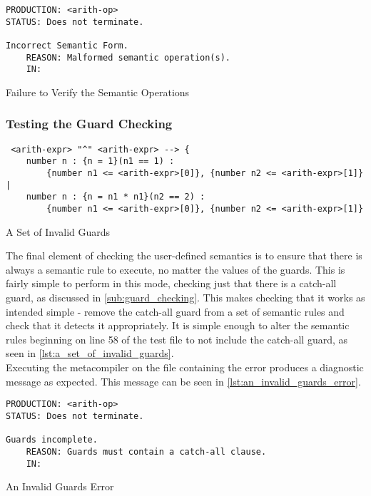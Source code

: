 \begin{listing}[!htb]
\begin{verbatim}
PRODUCTION: <arith-op>
STATUS: Does not terminate.

Incorrect Semantic Form.
    REASON: Malformed semantic operation(s).
    IN:
\end{verbatim}
\caption{Failure to Verify the Semantic Operations}
\label{lst:failure_to_verify_the_semantic_operations}
\end{listing}


\subsubsection{Testing the Guard Checking} %
\label{ssub:testing_the_guard_checking}
\begin{listing}[!htb]
\begin{verbatim}
 <arith-expr> "^" <arith-expr> --> {
    number n : {n = 1}(n1 == 1) :
        {number n1 <= <arith-expr>[0]}, {number n2 <= <arith-expr>[1]} |
    number n : {n = n1 * n1}(n2 == 2) :
        {number n1 <= <arith-expr>[0]}, {number n2 <= <arith-expr>[1]}
\end{verbatim}
\caption{A Set of Invalid Guards}
\label{lst:a_set_of_invalid_guards}
\end{listing}

The final element of checking the user-defined semantics is to ensure that there is always a semantic rule to execute, no matter the values of the guards. 
This is fairly simple to perform in this mode, checking just that there is a catch-all guard, as discussed in \autoref{sub:guard_checking}. 
This makes checking that it works as intended simple - remove the catch-all guard from a set of semantic rules and check that it detects it appropriately.
It is simple enough to alter the semantic rules beginning on line 58 of the test file to not include the catch-all guard, as seen in \autoref{lst:a_set_of_invalid_guards}. \\

Executing the metacompiler on the file containing the error produces a diagnostic message as expected.
This message can be seen in \autoref{lst:an_invalid_guards_error}.

\begin{listing}[!htb]
\begin{verbatim}
PRODUCTION: <arith-op>
STATUS: Does not terminate.

Guards incomplete.
    REASON: Guards must contain a catch-all clause.
    IN:
\end{verbatim}
\caption{An Invalid Guards Error}
\label{lst:an_invalid_guards_error}
\end{listing}

